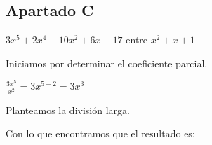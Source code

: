 \documentclass[letterpaper, 10pt]{article}
\begin{document}
            \vspace{3mm}
            \subsection{\textbf{Apartado C}}
                \begin{center} $3x^5+2x^4-10x^2+6x-17$ entre $x^2+x+1$ \end{center}
                Iniciamos por determinar el coeficiente parcial.
                \begin{center} $\frac{3x^5}{x^2}=3x^{5-2}=3x^3$ \end{center}
                Planteamos la división larga.
                \begin{center}  \end{center}
                Con lo que encontramos que el resultado es:
                \begin{center}  \\  \end{center}
    \newpage
    
\end{document}
